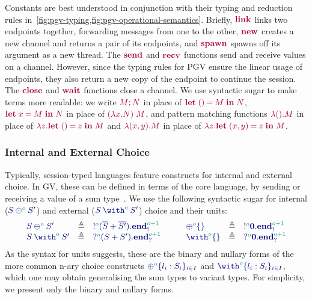 \documentclass[main.tex]{subfiles}
\begin{document}
Constants are best understood in conjunction with their typing and reduction rules in~\cref{fig:pgv-typing,fig:pgv-operational-semantics}. Briefly, $\tm{\link}$ links two endpoints together, forwarding messages from one to the other, $\tm{\new}$ creates a new channel and returns a pair of its endpoints, and $\tm{\spawn}$ spawns off its argument as a new thread. The $\tm{\send}$ and $\tm{\recv}$ functions send and receive values on a channel. However, since the typing rules for PGV ensure the linear usage of endpoints, they also return a new copy of the endpoint to continue the session. The $\tm{\close}$ and $\tm{\wait}$ functions close a channel.
We use syntactic sugar to make terms more readable: we write $\tm{\andthen{M}{N}}$ in place of $\tm{\letunit{M}{N}}$, $\tm{\letbind{x}{M}{N}}$ in place of $\tm{(\lambda x.N)\;M}$, and pattern matching functions $\tm{\lambda\unit.M}$ in place of $\tm{\lambda z.\letunit{z}{M}}$ and $\tm{\lambda\pair{x}{y}.M}$ in place of $\tm{\lambda z.\letpair{x}{y}{z}{M}}$.

\subsubsection*{Internal and External Choice}
Typically, session-typed languages feature constructs for internal and external choice. In GV, these can be defined in terms of the core language, by sending or receiving a value of a sum type~\cite{lindleymorris15}. We use the following syntactic sugar for internal ($\ty{\tyselect[\cs{o}]{S}{S'}}$) and external ($\ty{\tyoffer[\cs{o}]{S}{S'}}$) choice and their units:
\[
\begin{array}{lcl}
  \ty{\tyselect[\cs{o}]{S}{S'}}
  & \elabarrow & \ty{\tysend[\cs{o}]{(\tysum{\co{S}}{\co{S'}})}{\tyends[\cs{o+1}]}} \\
  \ty{\tyoffer[\cs{o}]{S}{S'}}
  & \elabarrow & \ty{\tyrecv[\cs{o}]{(\tysum{S}{S'})}{\tyendr[\cs{o+1}]}} \\
\end{array}
\qquad
\begin{array}{lcl}
  \ty{\tyselectemp[\cs{o}]}
  & \elabarrow & \ty{\tysend[\cs{o}]{\tyvoid}{\tyends[\cs{o+1}]}} \\
  \ty{\tyofferemp[\cs{o}]}
  & \elabarrow & \ty{\tyrecv[\cs{o}]{\tyvoid}{\tyendr[\cs{o+1}]}} \\
\end{array}
\]
As the syntax for units suggests, these are the binary and nullary forms of the more common n-ary choice constructs $\ty{{\oplus}^{\cs{o}}\{l_i:S_i\}_{i\in{I}}}$ and $\ty{{\with}^{\cs{o}}\{l_i:S_i\}_{i\in{I}}}$, which one may obtain generalising the sum types to variant types. For simplicity, we present only the binary and nullary forms.
\end{document}
